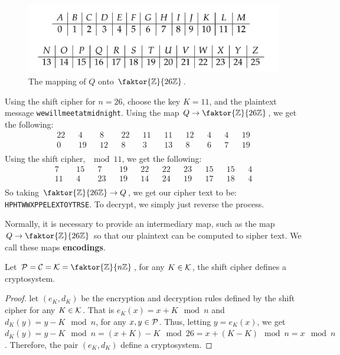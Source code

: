 \begin{figure}
    \centering
    \includegraphics[scale = 0.5]{Figures/Chapter1/alpha_to_num.png}
    \caption{The mapping of $Q$ onto  $\faktor{\Z}{26\Z}$.}
    \label{fig_1.2}
\end{figure}

\begin{example}
    Using the shift cipher for $n=26$, choose the key $K=11$, and the plaintext
    message \lstinline{wewillmeetatmidnight}. Using the map $Q \rightarrow
    \faktor{\Z}{26\Z}$, we get the following:
    \begin{align*}
        22 && 4 && 8 && 22 && 11 && 11 && 12 && 4 && 4 && 19 \\
        0 && 19 && 12 && 8 && 3 && 13 && 8 && 6 && 7 && 19 \\
    \end{align*}
    Using the shift cipher, $\mod{11}$, we get the following:
    \begin{align*}
        7 && 15 && 7 && 19 && 22 && 22 && 23 && 15 && 15 && 4 \\
        11 && 4 && 23 && 19 && 14 && 24 && 19 && 17 && 18 && 4 \\
    \end{align*}
    So taking $\faktor{\Z}{26\Z} \rightarrow Q$, we get our cipher text to be:
    \lstinline{HPHTWWXPPELEXTOYTRSE}. To decrypt, we simply just reverse the
    process.
\end{example}

Normally, it is necessary to provide an intermediary map, such as the map $Q
\rightarrow \faktor{\Z}{26\Z}$ so that our plaintext can be computed to sipher
text. We call these maps \textbf{encodings}.

\begin{theorem}\label{1.1.3}
    Let $\Pc=\Cc=\Kc=\faktor{\Z}{n\Z}$, for any $K \in \mathcal{K}$, the shift cipher
    defines a cryptosystem.
\end{theorem}
\begin{proof}
    let $(e_K,d_K)$ be the encryption and decryption rules defined by the
    shift cipher for any $K \in \mathcal{K}$. That is $e_K(x)=x+K \mod{n}$ and
    $d_K(y)=y-K \mod{n}$, for any $x,y \in \mathcal{P}$. Thus, letting  $y=e_K(x)$, we
    get $d_K(y)=y-K \mod{n}=(x+K)-K \mod{26}=x+(K-K) \mod{n}=x \mod{n}$.
    Therefore, the pair $(e_K,d_K)$ define a cryptosystem.
\end{proof}

